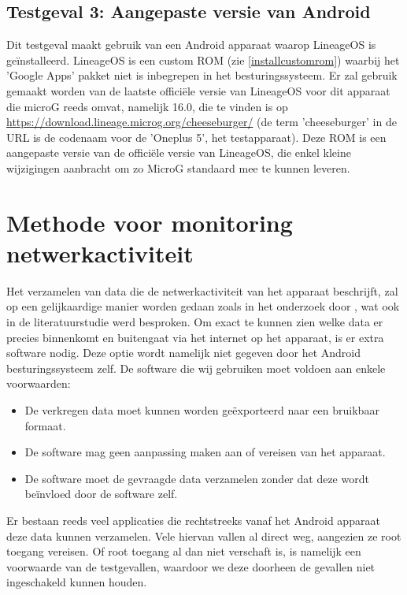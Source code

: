 \subsection{Testgeval 3: Aangepaste versie van Android}
\label{sec:testgeval3}
Dit testgeval maakt gebruik van een Android apparaat waarop LineageOS is geïnstalleerd. LineageOS is een custom ROM (zie \ref{installcustomrom}) waarbij het 'Google Apps' pakket niet is inbegrepen in het besturingssysteem. Er zal gebruik gemaakt worden van de laatste officiële versie van LineageOS voor dit apparaat die microG reeds omvat, namelijk 16.0, die te vinden is op \url{https://download.lineage.microg.org/cheeseburger/} (de term 'cheeseburger' in de URL is de codenaam voor de 'Oneplus 5', het testapparaat). Deze ROM is een aangepaste versie van de officiële versie van LineageOS, die enkel kleine wijzigingen aanbracht om zo MicroG standaard mee te kunnen leveren.

\section{Methode voor monitoring netwerkactiviteit}
\label{sec:metingsoftware}
Het verzamelen van data die de netwerkactiviteit van het apparaat beschrijft, zal op een gelijkaardige manier worden gedaan zoals in het onderzoek door \cite{schmidt_google-data-collection}, wat ook in de literatuurstudie werd besproken. Om exact te kunnen zien welke data er precies binnenkomt en buitengaat via het internet op het apparaat, is er extra software nodig. Deze optie wordt namelijk niet gegeven door het Android besturingssysteem zelf. De software die wij gebruiken moet voldoen aan enkele voorwaarden:
\begin{itemize}
    \item De verkregen data moet kunnen worden geëxporteerd naar een bruikbaar formaat.
    \item De software mag geen aanpassing maken aan of vereisen van het apparaat.
    \item De software moet de gevraagde data verzamelen zonder dat deze wordt beïnvloed door de software zelf.
\end{itemize}
Er bestaan reeds veel applicaties die rechtstreeks vanaf het Android apparaat deze data kunnen verzamelen. Vele hiervan vallen al direct weg, aangezien ze root toegang vereisen. Of root toegang al dan niet verschaft is, is namelijk een voorwaarde van de testgevallen, waardoor we deze doorheen de gevallen niet ingeschakeld kunnen houden. 

